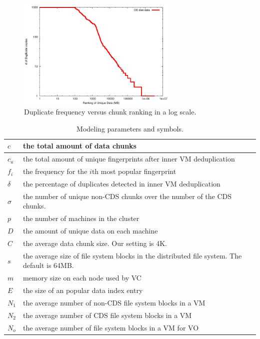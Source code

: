 \begin{figure}
\centering
 \includegraphics[width=3in]{figures/log-log-disk}
\caption{Duplicate frequency versus  chunk ranking in a log scale.}
\label{fig:Datazipf}
\end{figure}

\begin{table}[ht]
\centering
\begin{tabular}{|p{1.25cm}|p{6.5cm}|}
\hline
$c$ &  the total amount of data chunks\\ 
\hline
$c_u$ &  the total amount of unique fingerprints after inner VM  deduplication\\
\hline
$f_i$ &  the frequency for the $i$th most popular fingerprint\\
\hline
$\delta$ &  the percentage of duplicates detected in inner VM deduplication\\
\hline
$\sigma$ &  the number of unique non-CDS chunks over  the number of the CDS chunks.\\
\hline
$p$ & the number of machines in the cluster\\
\hline
$D$ & the amount of unique data on each machine\\
\hline
$C$ & the average data chunk size. Our setting is  4K.\\
\hline
$s$ & the average size of file system blocks in the distributed file system. The default is  64MB.\\
\hline
$m$ & memory size on each node used by VC\\ 
\hline
$E$ & the size of an popular data index entry\\
\hline
$N_1$ & the average number  of non-CDS file system blocks  in a VM\\
\hline
$N_2$ & the average number  of CDS file system blocks  in a VM\\
\hline
$N_o$ & the average number  of file system blocks  in a VM for VO\\
\hline
\end{tabular}
\caption{Modeling  parameters and symbols.}
\label{tab:symbol}
\end{table}

